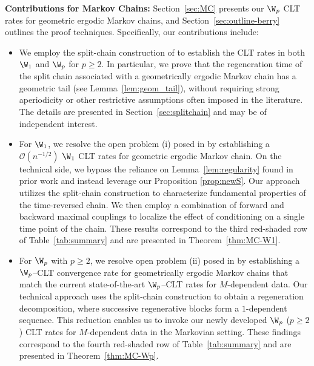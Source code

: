\documentclass[mnsc,nonblindrev]{informs3}
\begin{document}
\noindent\textbf{Contributions for Markov Chains:} Section~\ref{sec:MC} presents our $\W_p$ CLT rates for geometric ergodic Markov chains, and
Section~\ref{sec:outline-berry} outlines the proof techniques. Specifically, our contributions include:
\begin{itemize}
\item We employ the split-chain construction of \citet{nummelin1978splitting} to establish the CLT rates in both \(\W_1\) and \(\W_p\) for \(p \ge 2\). In particular, we prove that the regeneration time of the split chain associated with a geometrically ergodic Markov chain has a geometric tail (see Lemma~\ref{lem:geom_tail}), without requiring strong aperiodicity or other restrictive assumptions often imposed in the literature. The details are presented
in Section~\ref{sec:splitchain} and may be of independent interest.

    \item For $\W_1$, we resolve the open problem (i) posed in \cite{srikant2024rates} by establishing a $\mathcal O(n^{-1/2})$ $\W_1$ CLT rates for geometric ergodic Markov chain. On the technical side, we bypass the reliance on Lemma~\ref{lem:regularity}
found in prior work \citep{srikant2024rates,wu2025uncertainty} and instead leverage our
Proposition \ref{prop:newS}. Our approach utilizes the split-chain construction to
characterize fundamental properties of the time-reversed chain. We then employ a
combination of forward and backward maximal couplings to localize the effect of
conditioning on a single time point of the chain.
 These results correspond to the third red-shaded row of
Table~\ref{tab:summary} and are presented in Theorem~\ref{thm:MC-W1}.

    \item For $\W_p$ with $p\ge 2$, we resolve open problem (ii) posed in \cite{srikant2024rates}
by establishing a $\W_p$--CLT convergence rate for geometrically ergodic Markov
chains that match the current state-of-the-art $\W_p$--CLT rates for $M$-dependent data.
Our technical approach uses the split-chain construction to obtain a regeneration
decomposition, where successive regenerative blocks form a $1$-dependent
sequence. This reduction enables us to invoke our newly developed $\W_p$ ($p\ge 2$) CLT rates for
$M$-dependent data in the Markovian setting.
 These findings correspond to the fourth red-shaded row of
Table~\ref{tab:summary} and are presented in Theorem~\ref{thm:MC-Wp}.

\end{itemize}
\end{document}
